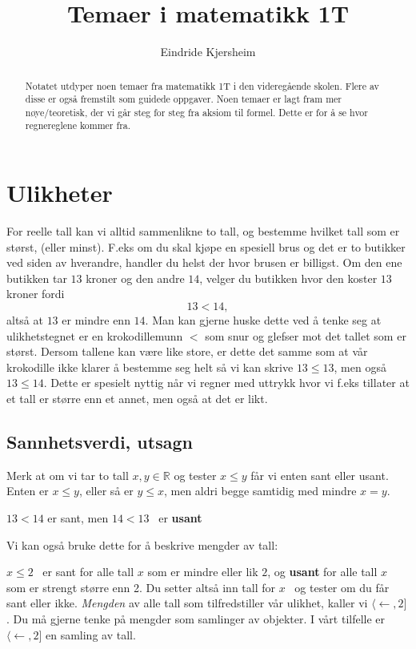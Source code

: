 \documentclass[11pt]{article}
\title{Temaer i matematikk 1T}
\author{Eindride Kjersheim}
\theoremstyle{definition}
\theoremstyle{definition}
\newcommand{\R}{\mathbb{R}}
\def\la{\langle}
\begin{document}
\maketitle

\begin{abstract}
Notatet utdyper noen temaer fra matematikk 1T i den videregående skolen.
Flere av disse er også fremstilt som guidede oppgaver. Noen temaer er lagt fram mer
nøye/teoretisk, der vi går steg for steg fra aksiom til formel. Dette er
for å se hvor regnereglene kommer fra.
\end{abstract}

\section{Ulikheter}
For reelle tall kan vi alltid sammenlikne to tall, og bestemme
hvilket tall som er størst, (eller minst). F.eks om du skal kjøpe
en spesiell brus og det er to butikker ved siden av hverandre,
   handler du helst der hvor brusen er billigst. Om den ene butikken
   tar $13$ kroner og den andre $14$, velger du butikken hvor den koster
   $13$ kroner fordi 
   \[13 < 14,\] 
   altså at $13$ er mindre enn $14$.
   Man kan gjerne huske dette ved å tenke seg at ulikhetstegnet er
   en krokodillemunn $<$ som snur og glefser mot det tallet som er størst.
   Dersom tallene kan være like store, er dette det samme som at vår krokodille
   ikke klarer å
   bestemme seg helt så vi kan skrive $13\leq 13$, men også
   $13 \leq 14$. Dette er spesielt nyttig når vi regner med uttrykk
   hvor vi f.eks tillater at et tall er større enn et annet, men også
   at det er likt.
\subsection{Sannhetsverdi, utsagn}
Merk at om vi tar to tall $x, y \in \R$ og tester $x \leq y$ får
vi enten sant eller usant. Enten er $x \leq y$, eller så er
$y \leq x$, men aldri begge samtidig med mindre $x = y$.
\begin{eksempel}
$13 < 14$ er sant, men $14 < 13$  er \textbf{usant}
\end{eksempel}

Vi kan også bruke dette for å beskrive mengder av tall:

\begin{eksempel}
$x\leq 2$  er sant for alle tall $x$ som er mindre eller lik $2$,
    og \textbf{usant} for alle tall $x$ som er strengt større enn 2.
Du setter altså inn tall for $x$  og tester om du får sant eller ikke.
\emph{Mengden} av alle tall som tilfredstiller vår ulikhet, kaller vi
$\la \leftarrow, 2]$. Du må gjerne tenke på mengder som samlinger av
objekter. I vårt tilfelle er $\la \leftarrow, 2]$ en samling av tall.
\end{eksempel}
\end{document}
